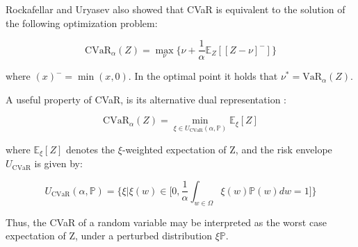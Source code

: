  Rockafellar and Uryasev \cite{Rockafellar2000} also showed that CVaR is equivalent to the solution of
 the following optimization problem:

\begin{equation}
    \text{CVaR}_\alpha (Z) = \underset{\nu} \max \big\{\nu + \frac{1}{\alpha} \mathbb E_Z[[Z- \nu]^-]\big\}
\end{equation}

where $(x)^- = \min(x,0)$. In the optimal point it holds that $\nu^*=\text{VaR}_\alpha(Z)$.

A useful property of CVaR, is its alternative dual representation \cite{Artzner1999}:

\begin{equation}
    \text{CVaR}_\alpha (Z) = \underset{\xi \in U_{\text{CVaR}} (\alpha, \mathbb{P})} \min \mathbb E_\xi[Z]
\end{equation}

where $\mathbb E_\xi[Z]$ denotes the $\xi$-weighted expectation of Z, and the risk envelope $U_\text{CVaR}$ is
given by:

\begin{equation}
    U_{\text{CVaR}}(\alpha, \mathbb{P}) = \Big\{\xi | \xi(w)  \in \big [ 0, \frac{1}{\alpha} \int_{w\in\Omega} \xi(w)\mathbb{P}(w)dw=1   \big ] \Big\}
\end{equation}

Thus, the CVaR of a random variable may be interpreted as the worst case expectation of Z, under
a perturbed distribution $\xi \mathbb{P}$.
